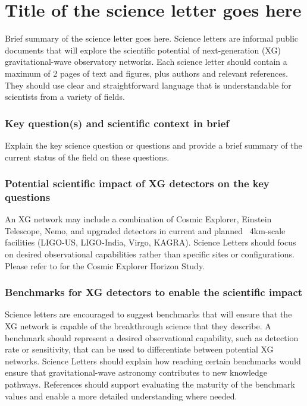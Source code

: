 \documentclass[11pt, singlecolumn, citestyle=authoryear]{elegantbook}
\begin{document}
\mainmatter


\chapter*{Title of the science letter goes here}


\begin{tcolorbox}[enhanced,attach boxed title to top center={yshift=-3mm,yshifttext=-1mm},colback=blue!5!white,colframe=blue!75!black,colbacktitle=blue!80!black,title=SUMMARY,fonttitle=\bfseries, boxed title style={size=small,colframe=blue!75!black} ]
  Brief summary of the science letter goes here. Science letters are informal public documents that will explore the scientific potential of next-generation (XG) gravitational-wave observatory networks. Each science letter should contain a maximum of 2 pages of text and figures, plus authors and relevant references.  They should use clear and straightforward language that is understandable for scientists from a variety of fields.

\end{tcolorbox}


\subsection*{Key question(s) and scientific context in brief} 
Explain the key science question or questions and provide a brief summary of the current status of the field on these questions.

\subsection*{Potential scientific impact of XG detectors on the key questions}
An XG network may include a combination of Cosmic Explorer, Einstein Telescope, Nemo, and upgraded detectors in current and planned ~4km-scale facilities (LIGO-US, LIGO-India, Virgo, KAGRA). Science Letters should focus on desired observational capabilities rather than specific sites or configurations. Please refer to \cite{2021arXiv210909882E} for the Cosmic Explorer Horizon Study. 
 
\subsection*{Benchmarks for XG detectors to enable the scientific impact}
Science letters are encouraged to suggest benchmarks that will ensure that the XG network is capable of the breakthrough science that they describe.  A benchmark should represent a desired observational capability, such as detection rate or sensitivity, that can be used to differentiate between potential XG networks. Science Letters should explain how reaching certain benchmarks would ensure that gravitational-wave astronomy contributes to new knowledge pathways. References should support evaluating the maturity of the benchmark values and enable a more detailed understanding where needed.
\end{document}

